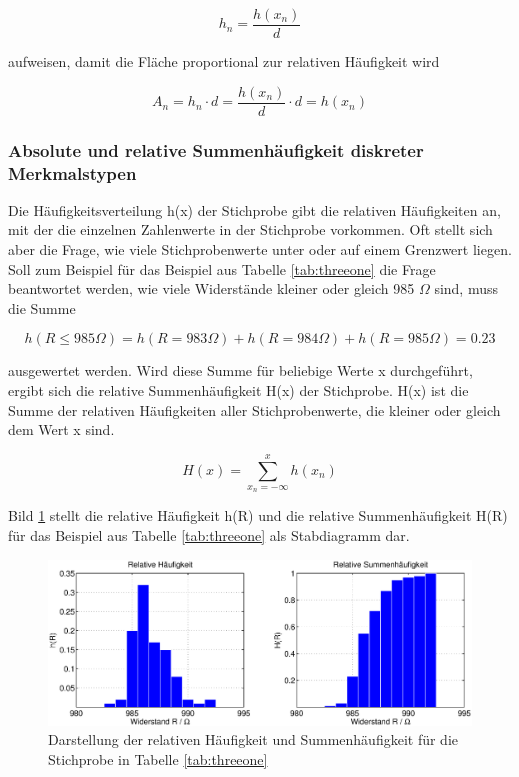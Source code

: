 \begin{equation}\label{eq:threeseven}
h_{n} =\dfrac{h\left(x_{n} \right)}{d}
\end{equation}

\noindent aufweisen, damit die Fl\"{a}che proportional zur relativen H\"{a}ufigkeit wird

\begin{equation}\label{eq:threeeight}
A_{n} =h_{n} \cdot d=\dfrac{h(x_{n})}{d} \cdot d=h(x_{n})
\end{equation}

\subsubsection{Absolute und relative Summenh\"{a}ufigkeit diskreter Merkmalstypen}\label{threetwotwo}

\noindent Die H\"{a}ufigkeitsverteilung h(x) der Stichprobe gibt die relativen H\"{a}ufigkeiten an, mit der die einzelnen Zahlenwerte in der Stichprobe vorkommen. Oft stellt sich aber die Frage, wie viele Stichprobenwerte unter oder auf einem Grenzwert liegen. Soll zum Beispiel f\"{u}r das Beispiel aus Tabelle \ref{tab:threeone} die Frage beantwortet werden, wie viele Widerst\"{a}nde kleiner oder gleich 985 $\Omega$ sind, muss die Summe

\begin{equation}\label{eq:threenine}
h(R\le 985 \Omega) = h(R=983 \Omega )+h(R=984 \Omega)+h(R=985\Omega )=0.23
\end{equation}

\noindent ausgewertet werden. Wird diese Summe f\"{u}r beliebige Werte x durchgef\"{u}hrt, ergibt sich die relative Summenh\"{a}ufigkeit H(x) der Stichprobe. H(x) ist die Summe der relativen H\"{a}ufigkeiten aller Stichprobenwerte, die kleiner oder gleich dem Wert x sind.

\begin{equation}\label{eq:threeten}
H(x)=\sum _{x_{n} =-\infty }^{x}h(x_{n})
\end{equation}

\noindent Bild \ref{fig:RelHaeufigkeitUndSummenhStichprobeWiderstand2} stellt die relative H\"{a}ufigkeit h(R) und die relative Summenh\"{a}ufigkeit H(R) f\"{u}r das Beispiel aus Tabelle \ref{tab:threeone} als Stabdiagramm dar.

\noindent 
\begin{figure}[H]
  \centerline{\includegraphics[width=1\textwidth]{Kapitel3/Bilder/image4}}
  \caption{Darstellung der relativen H\"{a}ufigkeit und Summenh\"{a}ufigkeit f\"{u}r die Stichprobe in Tabelle \ref{tab:threeone}}
  \label{fig:RelHaeufigkeitUndSummenhStichprobeWiderstand2}
\end{figure}

